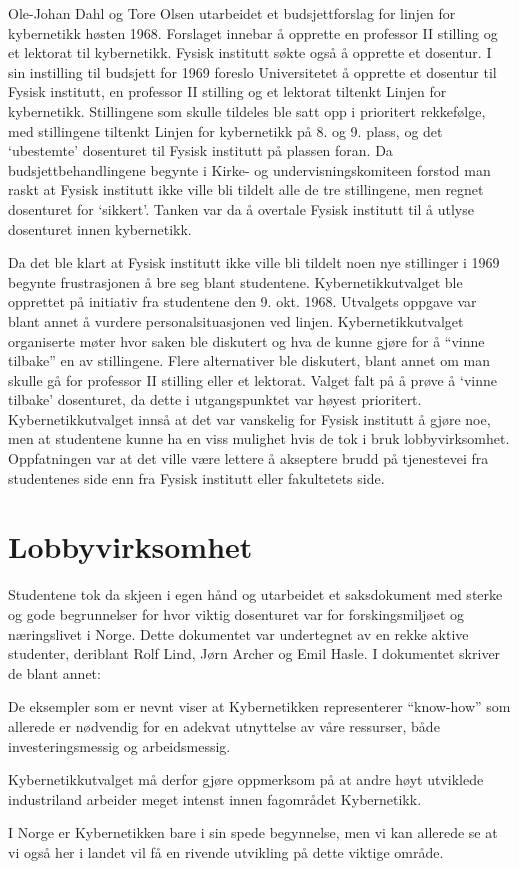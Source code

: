 Ole-Johan Dahl og Tore Olsen utarbeidet et budsjettforslag for linjen for kybernetikk høsten 1968. Forslaget innebar å opprette en professor II stilling og et lektorat til kybernetikk. Fysisk institutt søkte også å opprette et dosentur. I sin instilling til budsjett for 1969 foreslo Universitetet å opprette et dosentur til Fysisk institutt, en professor II stilling og et lektorat tiltenkt Linjen for kybernetikk. Stillingene som skulle tildeles ble satt opp i prioritert rekkefølge, med stillingene tiltenkt Linjen for kybernetikk på 8. og 9. plass, og det `ubestemte' dosenturet til Fysisk institutt på plassen foran. Da budsjettbehandlingene begynte i Kirke- og undervisningskomiteen forstod man raskt at Fysisk institutt ikke ville bli tildelt alle de tre stillingene, men regnet dosenturet for `sikkert'. Tanken var da å overtale Fysisk institutt til å utlyse dosenturet innen kybernetikk.

Da det ble klart at Fysisk institutt ikke ville bli tildelt noen nye stillinger i 1969 begynte frustrasjonen å bre seg blant studentene. Kybernetikkutvalget ble opprettet på initiativ fra studentene den 9. okt. 1968. Utvalgets oppgave var blant annet å vurdere personalsituasjonen ved linjen. Kybernetikkutvalget organiserte møter hvor saken ble diskutert og hva de kunne gjøre for å ``vinne tilbake'' en av stillingene. Flere alternativer ble diskutert, blant annet om man skulle gå for professor II stilling eller et lektorat. Valget falt på å prøve å `vinne tilbake' dosenturet, da dette i utgangspunktet var høyest prioritert. Kybernetikkutvalget innså at det var vanskelig for Fysisk institutt å gjøre noe, men at studentene kunne ha en viss mulighet hvis de tok i bruk lobbyvirksomhet. Oppfatningen var at det ville være lettere å akseptere brudd på tjenestevei fra studentenes side enn fra Fysisk institutt eller fakultetets side.

\section{Lobbyvirksomhet}

Studentene tok da skjeen i egen hånd og utarbeidet et saksdokument med sterke og gode begrunnelser for hvor viktig dosenturet var for forskingsmiljøet og næringslivet i Norge. Dette dokumentet var undertegnet av en rekke aktive studenter, deriblant Rolf Lind, Jørn Archer og Emil Hasle. I dokumentet skriver de blant annet:

\begin{displayquote}
	De eksempler som er nevnt viser at Kybernetikken representerer ``know-how'' som allerede er nødvendig for en adekvat utnyttelse av våre ressurser, både investeringsmessig og arbeidsmessig.

	Kybernetikkutvalget må derfor gjøre oppmerksom på at andre høyt utviklede industriland arbeider meget intenst innen fagområdet Kybernetikk.

	I Norge er Kybernetikken bare i sin spede begynnelse, men vi kan allerede se at vi også her i landet vil få en rivende utvikling på dette viktige område.
\end{displayquote}

